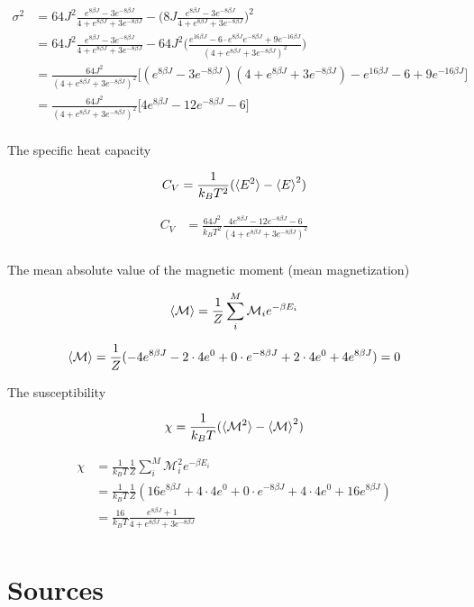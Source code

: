 \documentclass[11pt]{article}
\begin{document}
\begin{flushleft}
\begin{align*}
\sigma^2 &= 64J^2 \frac{e^{8 \beta J} - 3 e^{-8 \beta J}}{4 + e^{8 \beta J} + 3 e^{-8 \beta J}}
- \big( 8J \frac{e^{8 \beta J} - 3 e^{-8 \beta J}}{4 + e^{8 \beta J} + 3 e^{-8 \beta J}}
\big)^2\\
&= 64J^2 \frac{e^{8 \beta J} - 3 e^{-8 \beta J}}{4 + e^{8 \beta J} + 3 e^{-8 \beta J}}
- 64J^2\big(
\frac{e^{16 \beta J} - 6 \cdot e^{8 \beta J}e^{-8 \beta J} + 9 e^{-16 \beta J}}{(4 + e^{8 \beta J} + 3 e^{-8 \beta J})^2}
\big)\\
&= 
\frac{64J^2}{(4 + e^{8 \beta J} + 3 e^{-8 \beta J})^2}
\Big[
(e^{8 \beta J} - 3 e^{-8 \beta J})(4 + e^{8 \beta J} + 3 e^{-8 \beta J})
-e^{16 \beta J} - 6  + 9 e^{-16 \beta J}
\Big]\\
&= \frac{64J^2}{(4 + e^{8 \beta J} + 3 e^{-8 \beta J})^2}
\Big[
4 e^{8 \beta J} 
- 12 e^{-8 \beta J}  - 6 
\Big] \\
\end{align*}

The specific heat capacity 

\begin{equation}
C_V = \frac{1}{k_B T^2} (\braket{E^2} - \braket{E}^2)
\end{equation}

\begin{align*}
C_V &= \frac{64J^2}{k_B T^2}
\frac{4 e^{8 \beta J} 
- 12 e^{-8 \beta J}  - 6 }{(4 + e^{8 \beta J} + 3 e^{-8 \beta J})^2}\\
\end{align*}


The mean absolute value of the magnetic moment (mean magnetization)

\begin{equation}
\braket{\mathcal{M}} = \frac{1}{Z} \sum_i^M \mathcal{M}_i e^{- \beta E_i}
\end{equation}

\begin{align*}
\braket{\mathcal{M}} = \frac{1}{Z} (-4 e^{8 \beta J} - 2 \cdot 4 e^0 + 0 \cdot e^{-8 \beta J} + 2 \cdot 4 e^0 + 4 e^{8 \beta J}) = 0
\end{align*}



The susceptibility

\begin{equation}
\chi = \frac{1}{k_B T} (\braket{\mathcal{M}^2} - \braket{\mathcal{M}}^2)
\end{equation}

\begin{align*}
\chi &= \frac{1}{k_B T} \frac{1}{Z} \sum_i^M \mathcal{M}_i^2 e^{- \beta E_i}\\
&= \frac{1}{k_B T} 
\frac{1}{Z} (16e^{8 \beta J} + 4 \cdot 4 e^0 + 0 \cdot e^{-8 \beta J} + 4 \cdot 4 e^0 + 16 e^{8 \beta J})\\
&= \frac{16}{k_B T} 
\frac{e^{8 \beta J} + 1}{4 + e^{8 \beta J} + 3 e^{-8 \beta J}} \\
\end{align*}

\end{flushleft}


\section{Sources}
\end{document}
